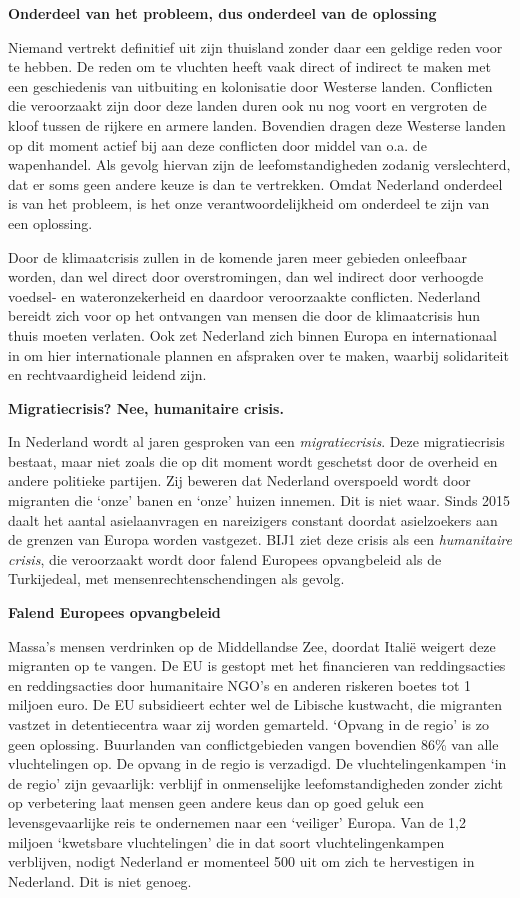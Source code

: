 \textbf{Onderdeel van het probleem, dus onderdeel van de oplossing}

Niemand vertrekt definitief uit zijn thuisland zonder daar een geldige
reden voor te hebben. De reden om te vluchten heeft vaak direct of
indirect te maken met een geschiedenis van uitbuiting en kolonisatie
door Westerse landen. Conflicten die veroorzaakt zijn door deze landen
duren ook nu nog voort en vergroten de kloof tussen de rijkere en armere
landen. Bovendien dragen deze Westerse landen op dit moment actief bij
aan deze conflicten door middel van o.a. de wapenhandel. Als gevolg
hiervan zijn de leefomstandigheden zodanig verslechterd, dat er soms
geen andere keuze is dan te vertrekken. Omdat Nederland onderdeel is van
het probleem, is het onze verantwoordelijkheid om onderdeel te zijn van
een oplossing.

Door de klimaatcrisis zullen in de komende jaren meer gebieden
onleefbaar worden, dan wel direct door overstromingen, dan wel indirect
door verhoogde voedsel- en wateronzekerheid en daardoor veroorzaakte
conflicten. Nederland bereidt zich voor op het ontvangen van mensen die
door de klimaatcrisis hun thuis moeten verlaten. Ook zet Nederland zich
binnen Europa en internationaal in om hier internationale plannen en
afspraken over te maken, waarbij solidariteit en rechtvaardigheid
leidend zijn.

\textbf{Migratiecrisis? Nee, humanitaire crisis.}

In Nederland wordt al jaren gesproken van een \emph{migratiecrisis}.
Deze migratiecrisis bestaat, maar niet zoals die op dit moment wordt
geschetst door de overheid en andere politieke partijen. Zij beweren dat
Nederland overspoeld wordt door migranten die `onze' banen en `onze'
huizen innemen. Dit is niet waar. Sinds 2015 daalt het aantal
asielaanvragen en nareizigers constant doordat asielzoekers aan de
grenzen van Europa worden vastgezet. BIJ1 ziet deze crisis als een
\emph{humanitaire crisis}, die veroorzaakt wordt door falend Europees
opvangbeleid als de Turkijedeal, met mensenrechtenschendingen als
gevolg.

\textbf{Falend Europees opvangbeleid}

Massa's mensen verdrinken op de Middellandse Zee, doordat Italië weigert
deze migranten op te vangen. De EU is gestopt met het financieren van
reddingsacties en reddingsacties door humanitaire NGO's en anderen
riskeren boetes tot 1 miljoen euro. De EU subsidieert echter wel de
Libische kustwacht, die migranten vastzet in detentiecentra waar zij
worden gemarteld. `Opvang in de regio' is zo geen oplossing. Buurlanden
van conflictgebieden vangen bovendien 86\% van alle vluchtelingen op. De
opvang in de regio is verzadigd. De vluchtelingenkampen `in de regio'
zijn gevaarlijk: verblijf in onmenselijke leefomstandigheden zonder
zicht op verbetering laat mensen geen andere keus dan op goed geluk een
levensgevaarlijke reis te ondernemen naar een `veiliger' Europa. Van de
1,2 miljoen `kwetsbare vluchtelingen' die in dat soort
vluchtelingenkampen verblijven, nodigt Nederland er momenteel 500 uit om
zich te hervestigen in Nederland. Dit is niet genoeg.

